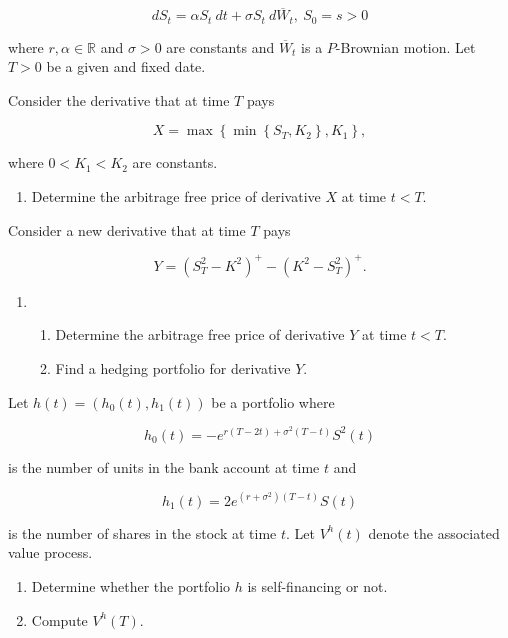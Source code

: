 \documentclass[a4paper,12pt,openany]{book}
\providecommand{\tightlist}{%
 \setlength{\itemsep}{0pt}\setlength{\parskip}{0pt}}
\begin{document}
\[
dS_t=\alpha S_t\ dt+\sigma S_t\ d\overline{W}_t,\ S_0=s>0
\]

where \(r,\alpha\in\mathbb{R}\) and \(\sigma >0\) are constants and \(\overline{W}_t\) is a \(P\)-Brownian motion. Let \(T>0\) be a given and fixed date.

Consider the derivative that at time \(T\) pays

\[
X=\max\left\{\min\left\{S_T,K_2\right\},K_1\right\},
\]

where \(0<K_1<K_2\) are constants.

\begin{enumerate}
\def\labelenumi{\alph{enumi}.}
\tightlist
\item
  Determine the arbitrage free price of derivative \(X\) at time \(t<T\).
\end{enumerate}

Consider a new derivative that at time \(T\) pays

\[
Y=(S^2_T-K^2)^+-(K^2-S^2_T)^+.
\]

\begin{enumerate}
\def\labelenumi{\alph{enumi}.}
\setcounter{enumi}{1}
\item
  \begin{enumerate}
  \def\labelenumii{\roman{enumii}.}
  \tightlist
  \item
    Determine the arbitrage free price of derivative \(Y\) at time \(t<T\).
  \item
    Find a hedging portfolio for derivative \(Y\).
  \end{enumerate}
\end{enumerate}

Let \(h(t)=(h_0(t),h_1(t))\) be a portfolio where

\[
h_0(t)=-e^{r(T-2t)+\sigma^2(T-t)}S^2(t)
\]

is the number of units in the bank account at time \(t\) and

\[
h_1(t)=2e^{(r+\sigma^2)(T-t)}S(t)
\]

is the number of shares in the stock at time \(t\). Let \(V^h(t)\) denote the associated value process.

\begin{enumerate}
\def\labelenumi{\alph{enumi}.}
\setcounter{enumi}{2}
\tightlist
\item
  Determine whether the portfolio \(h\) is self-financing or not.
\item
  Compute \(V^h(T)\).
\end{enumerate}
\end{document}
